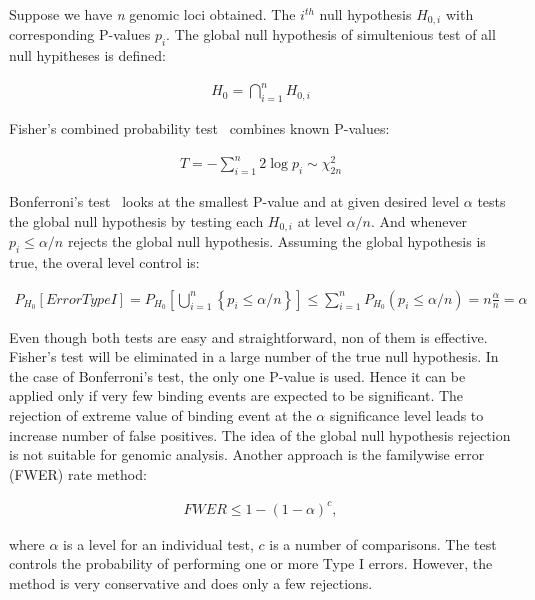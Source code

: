 Suppose we have \textit{n} genomic loci obtained.
The $i^{th}$ null hypothesis $H_{0,i}$ with corresponding P-values $p_i$.
The global null hypothesis of simultenious test of all null hypitheses  is defined:

\begin{align*}
    H_0 = \displaystyle\bigcap_{i=1}^{n} H_{0, i}
\end{align*}

Fisher's combined probability test~\cite{fisher1992statistical} combines known P-values:

\begin{align*}
    T = - \displaystyle \sum_{i=1}^{n} 2 \log p_i \sim  \chi_{2n}^{2}
\end{align*}

Bonferroni's test~\cite{hommel1988stagewise} looks at the smallest P-value and at given desired level $\alpha$ tests the global null hypothesis by testing each $H_{0,i}$ at level $\alpha /n$. 
And whenever $p_i \leq \alpha / n$ rejects the global null hypothesis.
Assuming the global hypothesis is true, the overal level control is: 

\begin{align*}
    P_{H_0}[Error Type I] = P_{H_0} \left[\bigcup_{i=1}^{n} \left\{ p_i \leq \alpha / n\right\}\right] \leq \sum_{i=1}^{n} P_{H_0}(p_i \le \alpha / n)  = n \frac{\alpha}{n} = \alpha
\end{align*}

Even though both tests are easy and straightforward, non of them is effective. 
Fisher's test will be eliminated in a large number of the true null hypothesis. 
In the case of  Bonferroni's test, the only one P-value is used. 
Hence it can be applied only if very few binding events are expected to be significant. 
The rejection of extreme value of binding event at the $\alpha$ significance level leads to increase number of false positives. 
The idea of the global null hypothesis rejection is not suitable for genomic analysis. 
Another approach is the familywise error (FWER) rate method:

\begin{align*}
    FWER \leq 1 - (1 - \alpha)^c, 
\end{align*}

where $\alpha$ is a level for an individual test, $c$ is a number of comparisons.
The test controls the probability of performing one or more Type I errors. 
However, the method is very conservative and does only a few rejections. 

